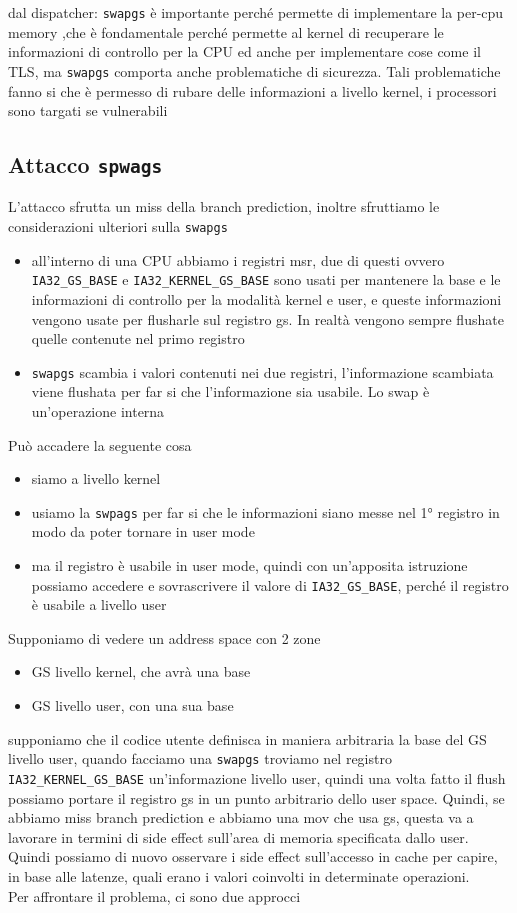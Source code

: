 \documentclass[12pt, oneside]{extbook}
\begin{document}
dal dispatcher: \texttt{swapgs} è importante perché permette di implementare la per-cpu memory ,che è fondamentale perché permette al kernel di recuperare le informazioni di controllo per la CPU ed anche per implementare cose come il TLS, ma \texttt{swapgs} comporta anche problematiche di sicurezza. Tali problematiche fanno si che è permesso di rubare delle informazioni a livello kernel, i processori sono targati se vulnerabili
\subsection{Attacco \texttt{spwags}}
L'attacco sfrutta un miss della branch prediction, inoltre sfruttiamo le considerazioni ulteriori sulla \texttt{swapgs}
\begin{itemize}
\item all'interno di una CPU abbiamo i registri msr, due di questi ovvero \texttt{IA32\_GS\_BASE} e \texttt{IA32\_KERNEL\_GS\_BASE} sono usati per mantenere la base e le informazioni di controllo per la modalità kernel e user, e queste informazioni vengono usate per flusharle sul registro gs. In realtà vengono sempre flushate quelle contenute nel primo registro
\item \texttt{swapgs} scambia i valori contenuti nei due registri, l'informazione scambiata viene flushata per far si che l'informazione sia usabile. Lo swap è un'operazione interna
\end{itemize}
Può accadere la seguente cosa
\begin{itemize}
\item siamo a livello kernel
\item usiamo la \texttt{swpags} per far si che le informazioni siano messe nel 1° registro in modo da poter tornare in user mode
\item ma il registro è usabile in user mode, quindi con un'apposita istruzione possiamo accedere e sovrascrivere il valore di \texttt{IA32\_GS\_BASE}, perché il registro è usabile a livello user
\end{itemize}
Supponiamo di vedere un address space con 2 zone
\begin{itemize}
\item GS livello kernel, che avrà una base
\item GS livello user, con una sua base
\end{itemize}
supponiamo che il codice utente definisca in maniera arbitraria la base del GS livello user, quando facciamo una \texttt{swapgs} troviamo nel registro \texttt{IA32\_KERNEL\_GS\_BASE} un'informazione livello user, quindi una volta fatto il flush possiamo portare il registro gs in un punto arbitrario dello user space. Quindi, se abbiamo miss branch prediction e abbiamo una mov che usa gs, questa va a lavorare in termini di side effect sull'area di memoria specificata dallo user. Quindi possiamo di nuovo osservare i side effect sull'accesso in cache per capire, in base alle latenze, quali erano i valori coinvolti in determinate operazioni.\\ Per affrontare il problema, ci sono due approcci
\end{document}
